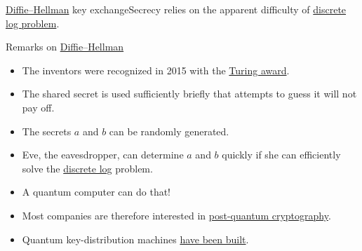 \begin{frame}{\href{https://en.wikipedia.org/wiki/Diffie-Hellman_key_exchange}{Diffie--Hellman} key exchange}{Secrecy relies on the apparent difficulty of \href{https://en.wikipedia.org/wiki/Discrete_logarithm}{discrete log problem}.}

\Vskip{-3em}\begin{ProtocolDialog}{0.28\textwidth}{0.33\textwidth}{0.37\textwidth}
\end{ProtocolDialog}
    
\end{frame}

\begin{frame}{Remarks on \href{https://en.wikipedia.org/wiki/Diffie-Hellman_key_exchange}{Diffie--Hellman}}
\begin{itemize}[<+->]
    \item The inventors were recognized in 2015 with the \href{https://awards.acm.org/about/2015-turing}{Turing award}.
    \item The shared secret is used sufficiently briefly that attempts to guess it will not pay off.
    \item The secrets $a$ and $b$ can be randomly generated.
    \item Eve, the eavesdropper, can determine $a$ and $b$ quickly if she can efficiently solve the \href{https://en.wikipedia.org/wiki/Discrete_logarithm}{discrete log} problem.
    \item A quantum computer can do that!
    \item Most companies are therefore interested in \href{https://en.wikipedia.org/wiki/Post-quantum_cryptography}{post-quantum cryptography}.
    \item Quantum key-distribution machines \href{https://en.wikipedia.org/wiki/Quantum_key_distribution\#Implementations}{have been built}.
\end{itemize}
\end{frame}

